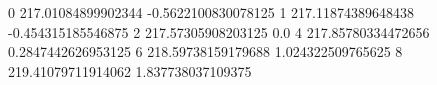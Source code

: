 0 217.01084899902344 -0.5622100830078125
1 217.11874389648438 -0.454315185546875
2 217.57305908203125 0.0
4 217.85780334472656 0.2847442626953125
6 218.59738159179688 1.024322509765625
8 219.41079711914062 1.837738037109375

